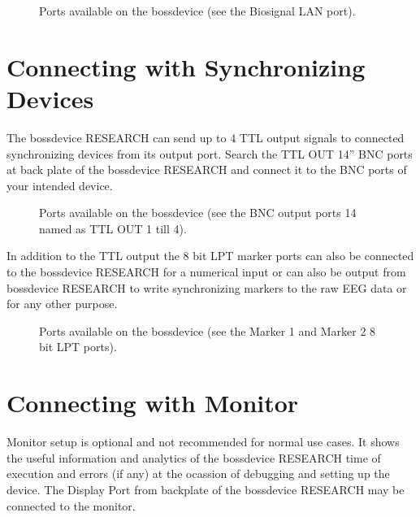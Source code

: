 \documentclass[letterpaper,10pt,english]{sphinxmanual}
\begin{document}
\begin{figure}[htbp]
\centering
\capstart

\noindent{}
\caption{Ports available on the bossdevice (see the Biosignal LAN port).}\label{\detokenize{2_setup_bossdevice_research:id3}}\end{figure}


\section{Connecting with Synchronizing Devices}
\label{\detokenize{2_setup_bossdevice_research:connecting-with-synchronizing-devices}}
\sphinxAtStartPar
The bossdevice RESEARCH can send up to 4 TTL output signals to connected synchronizing devices from its output port. Search the TTL OUT 1\sphinxhyphen{}4” BNC ports at back plate of the bossdevice RESEARCH and connect it to the BNC ports of your intended device.

\begin{figure}[htbp]
\centering
\capstart

\noindent{}
\caption{Ports available on the bossdevice (see the BNC output ports 1\sphinxhyphen{}4 named as TTL OUT 1 till 4).}\label{\detokenize{2_setup_bossdevice_research:id4}}\end{figure}

\sphinxAtStartPar
In addition to the TTL output the 8 bit LPT marker ports can also be connected to the bossdevice RESEARCH for a numerical input or can also be output from bossdevice RESEARCH to write synchronizing markers to the raw EEG data or for any other purpose.

\begin{figure}[htbp]
\centering
\capstart

\noindent{}
\caption{Ports available on the bossdevice (see the Marker 1 and Marker 2 8 bit LPT ports).}\label{\detokenize{2_setup_bossdevice_research:id5}}\end{figure}


\section{Connecting with Monitor}
\label{\detokenize{2_setup_bossdevice_research:connecting-with-monitor}}
\sphinxAtStartPar
Monitor setup is optional and not recommended for normal use cases. It shows the useful information and analytics of the bossdevice RESEARCH time of execution and errors (if any) at the ocassion of debugging and setting up the device. The Display Port from backplate of the bossdevice RESEARCH may be connected to the monitor.
\end{document}
